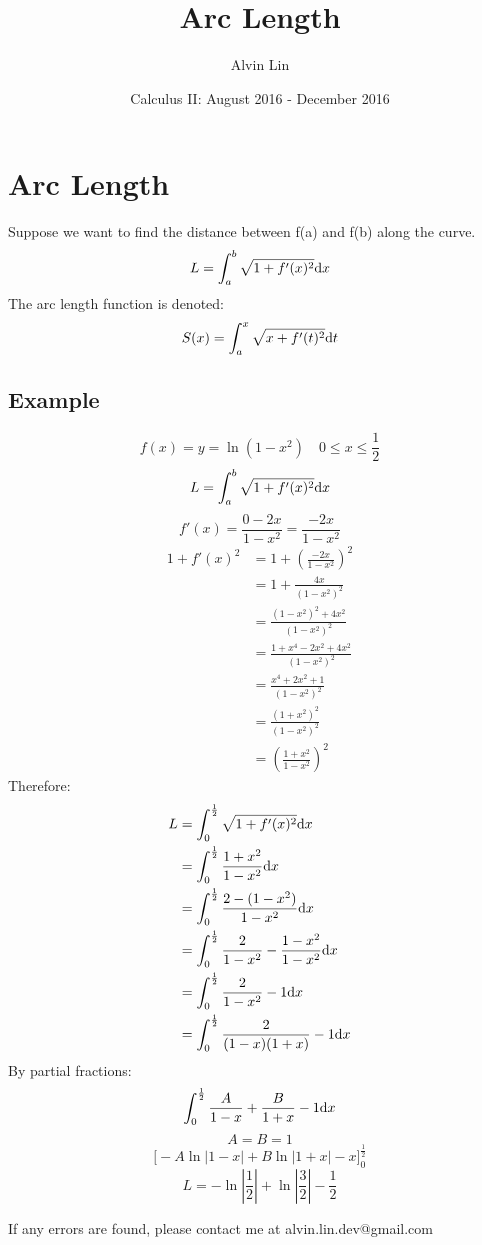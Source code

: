 \documentclass[letterpaper, 12pt]{math}
\title{Arc Length}
\author{Alvin Lin}
\date{Calculus II: August 2016 - December 2016}
\begin{document}
\maketitle

\section*{Arc Length}
\begin{center}
\end{center}
Suppose we want to find the distance between f(a) and f(b) along the curve.
\[ L = \int_{a}^{b}{\sqrt{1+f'(x)^{2}}\mathrm{d}{x}} \]
The arc length function is denoted:
\[ S(x) = \int_{a}^{x}{\sqrt{x+f'(t)^{2}}\mathrm{d}{t}} \]

\subsection*{Example}
\[ f(x) = y = \ln(1-x^{2}) \quad 0 \leq x \leq \frac{1}{2} \]
\[ L = \int_{a}^{b}{\sqrt{1+f'(x)^{2}}\mathrm{d}{x}} \]
\[ f'(x) = \frac{0-2x}{1-x^{2}} = \frac{-2x}{1-x^{2}} \]
\begin{align*}
  1 + f'(x)^{2} &= 1+(\frac{-2x}{1-x^{2}})^{2} \\
  &= 1+\frac{4x}{(1-x^{2})^{2}} \\
  &= \frac{(1-x^{2})^{2}+4x^{2}}{(1-x^{2})^{2}} \\
  &= \frac{1+x^{4}-2x^{2}+4x^{2}}{(1-x^{2})^{2}} \\
  &= \frac{x^{4}+2x^{2}+1}{(1-x^{2})^{2}} \\
  &= \frac{(1+x^{2})^{2}}{(1-x^{2})^{2}} \\
  &= (\frac{1+x^{2}}{1-x^{2}})^{2}
\end{align*}
Therefore:
\begin{align*}
  L &= \int_{0}^{\frac{1}{2}}{\sqrt{1+f'(x)^{2}}\mathrm{d}{x}} \\
  &= \int_{0}^{\frac{1}{2}}{\frac{1+x^{2}}{1-x^{2}}\mathrm{d}{x}} \\
  &= \int_{0}^{\frac{1}{2}}{\frac{2-(1-x^{2})}{1-x^{2}}\mathrm{d}{x}} \\
  &= \int_{0}^{\frac{1}{2}}{\frac{2}{1-x^{2}}-
     \frac{1-x^{2}}{1-x^{2}}\mathrm{d}{x}} \\
  &= \int_{0}^{\frac{1}{2}}{\frac{2}{1-x^{2}}-1\mathrm{d}{x}} \\
  &= \int_{0}^{\frac{1}{2}}{\frac{2}{(1-x)(1+x)}-1\mathrm{d}{x}}
\end{align*}
By partial fractions:
\[ \int_{0}^{\frac{1}{2}}{\frac{A}{1-x}+\frac{B}{1+x}-1\mathrm{d}{x}} \]
\[ A = B = 1 \]
\[ \bigg[-A\ln|1-x|+B\ln|1+x|-x\bigg]_{0}^{\frac{1}{2}} \]
\[ L = -\ln|\frac{1}{2}|+\ln|\frac{3}{2}|-\frac{1}{2} \]

\begin{center}
  If any errors are found, please contact me at alvin.lin.dev@gmail.com
\end{center}
\end{document}
